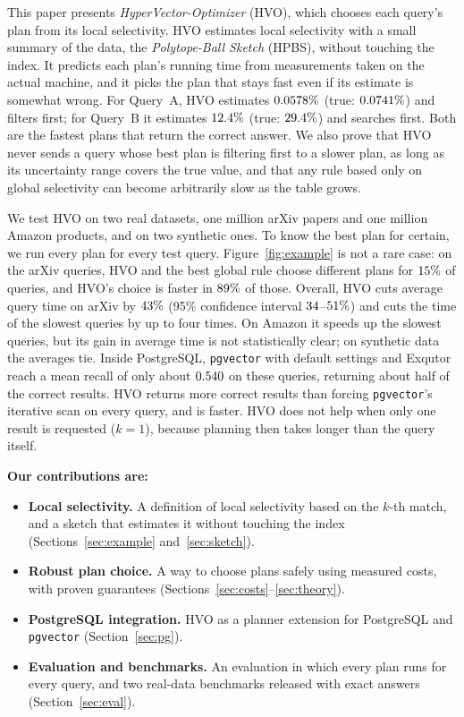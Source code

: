 \documentclass[sigconf,nonacm]{acmart}
\begin{document}
This paper presents \emph{HyperVector-Optimizer} (HVO), which chooses each query's plan from its local selectivity. HVO estimates local selectivity with a small summary of the data, the \emph{Polytope-Ball Sketch} (HPBS), without touching the index. It predicts each plan's running time from measurements taken on the actual machine, and it picks the plan that stays fast even if its estimate is somewhat wrong. For Query~A, HVO estimates $0.0578\%$ (true: $0.0741\%$) and filters first; for Query~B it estimates $12.4\%$ (true: $29.4\%$) and searches first. Both are the fastest plans that return the correct answer. We also prove that HVO never sends a query whose best plan is filtering first to a slower plan, as long as its uncertainty range covers the true value, and that any rule based only on global selectivity can become arbitrarily slow as the table grows.

We test HVO on two real datasets, one million arXiv papers and one million Amazon products, and on two synthetic ones. To know the best plan for certain, we run every plan for every test query. Figure~\ref{fig:example} is not a rare case: on the arXiv queries, HVO and the best global rule choose different plans for $15\%$ of queries, and HVO's choice is faster in $89\%$ of those. Overall, HVO cuts average query time on arXiv by $43\%$ (95\% confidence interval $34$--$51\%$) and cuts the time of the slowest queries by up to four times. On Amazon it speeds up the slowest queries, but its gain in average time is not statistically clear; on synthetic data the averages tie. Inside PostgreSQL, \texttt{pgvector} with default settings and Exqutor reach a mean recall of only about $0.540$ on these queries, returning about half of the correct results. HVO returns more correct results than forcing \texttt{pgvector}'s iterative scan on every query, and is faster. HVO does not help when only one result is requested ($k=1$), because planning then takes longer than the query itself.

\noindent\textbf{Our contributions are:}
\begin{itemize}
  \item \textbf{Local selectivity.} A definition of local selectivity based on the $k$-th match, and a sketch that estimates it without touching the index (Sections~\ref{sec:example} and~\ref{sec:sketch}).
  \item \textbf{Robust plan choice.} A way to choose plans safely using measured costs, with proven guarantees (Sections~\ref{sec:costs}--\ref{sec:theory}).
  \item \textbf{PostgreSQL integration.} HVO as a planner extension for PostgreSQL and \texttt{pgvector} (Section~\ref{sec:pg}).
  \item \textbf{Evaluation and benchmarks.} An evaluation in which every plan runs for every query, and two real-data benchmarks released with exact answers~\cite{hvobench} (Section~\ref{sec:eval}).
\end{itemize}
\end{document}
